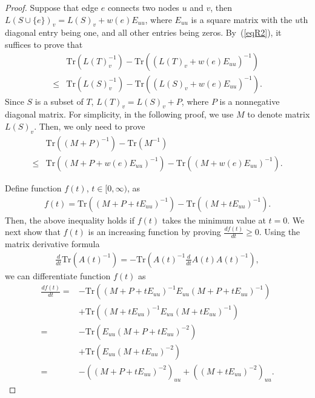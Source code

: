 \documentclass{article}
\def\kh#1{\left( #1 \right)}
\newcommand\LL{\bm{\mathit{L}}}
\renewcommand\AA{\boldsymbol{\mathit{A}}}
\newcommand\EE{\boldsymbol{\mathit{E}}}
\newcommand\PP{\boldsymbol{\mathit{P}}}
\newcommand\MM{\boldsymbol{\mathit{M}}}
\def\trace#1{\mathrm{Tr} \left(#1 \right)}
\begin{document}
\begin{proof}
Suppose that edge $e$ connects two nodes $u$ and $v$, then $\LL(S\cup\{e\})_v = \LL(S)_v + w(e)\EE_{uu}$, where $\EE_{uu}$ is a square matrix with the $u$th diagonal entry being one, and all other  entries being zeros.
By~(\ref{eqR2}), it suffices to prove that
\small
\begin{align*}
	& \trace{\LL(T)_v^{-1}} - \trace{\kh{\LL(T)_v + w(e) \EE_{uu}}^{-1}} \\
	 \leq & \trace{\LL(S)_v^{-1}} - \trace{\kh{\LL(S)_v + w(e) \EE_{uu}}^{-1}}.
\end{align*}
\normalsize
Since $S$ is a subset of $T$, $\LL(T)_v = \LL(S)_v + \PP$, where $\PP$ is a nonnegative diagonal matrix. For simplicity, in the following proof, we use $\MM$ to denote  matrix $\LL(S)_v$. Then, we only need to prove
\small
\begin{align*}
	&\trace{\kh{\MM+\PP}^{-1}} - \trace{\MM^{-1}}  \\
	\leq &\trace{\kh{\MM+\PP + w(e) \EE_{uu}}^{-1}} - \trace{\kh{\MM + w(e) \EE_{uu}}^{-1}}.
\end{align*}
\normalsize

Define  function $f(t)$, $t \in [0,\infty)$, as
\small
\begin{align*}
f(t) = \trace{\kh{\MM+\PP + t \EE_{uu}}^{-1}} - \trace{\kh{\MM + t \EE_{uu}}^{-1}}.
\end{align*}
\normalsize
Then, the above inequality holds if $f(t)$ takes the minimum value at $t = 0$. We next show that  $f(t)$ is an increasing function by proving $\frac{df(t)}{dt} \geq 0$.
Using the matrix derivative formula  %
\small
\begin{align*}
	\frac{d}{dt}\trace{\AA(t)^{-1}} = -\trace{\AA(t)^{-1} \frac{d}{dt}\AA(t) \AA(t)^{-1}},
\end{align*}
\normalsize we can differentiate function $f(t)$ as
\small
\begin{align*}
	\frac{df(t)}{dt}  = & - \trace{\kh{\MM+\PP + t \EE_{uu}}^{-1} \EE_{uu} \kh{\MM+\PP + t \EE_{uu}}^{-1}} \\
 				&+ \trace{\kh{\MM + t \EE_{uu}}^{-1} \EE_{uu} \kh{\MM + t \EE_{uu}}^{-1}}\\
 			      = & - \trace{ \EE_{uu} \kh{\MM+\PP + t \EE_{uu}}^{-2}} \\
 				&+ \trace{ \EE_{uu} \kh{\MM + t \EE_{uu}}^{-2}}\\
 			      =& - \kh{\kh{\MM+\PP + t \EE_{uu}}^{-2}}_{uu} + \kh{\kh{\MM + t \EE_{uu}}^{-2}}_{uu}.
\end{align*}
\normalsize


\end{proof}
\end{document}

